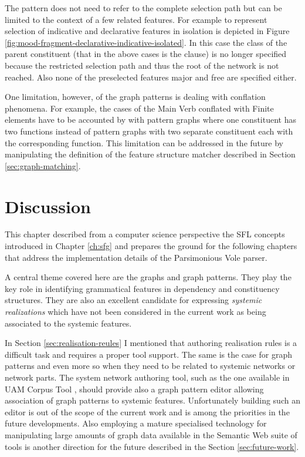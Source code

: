 The pattern does not need to refer to the complete selection path but can be limited to the context of a few related features. For example to represent selection of indicative and declarative features in isolation is depicted in Figure \ref{fig:mood-fragment-declarative-indicative-isolated}. In this case the class of the parent constituent (that in the above cases is the clause) is no longer specified because the restricted selection path and thus the root of the network is not reached. Also none of the preselected features major and free are specified either.  

One limitation, however, of the graph patterns is dealing with conflation phenomena. For example, the cases of the Main Verb conflated with Finite elements have to be accounted by with pattern graphs where one constituent has two functions instead of pattern graphs with two separate constituent each with the corresponding function. This limitation can be addressed in the future by manipulating the definition of the feature structure matcher described in Section \ref{sec:graph-matching}.

\section{Discussion}
This chapter described from a computer science perspective the SFL concepts introduced in Chapter \ref{ch:sfg} and prepares the ground for the following chapters that address the implementation details of the Parsimonious Vole parser.  

A central theme covered here are the graphs and graph patterns. They play the key role in identifying grammatical features in dependency and constituency structures. They are also an excellent candidate for expressing \textit{systemic realizations} which have not been considered in the current work as being associated to the systemic features.  

In Section \ref{sec:realisation-reules} I mentioned that authoring realisation rules is a difficult task and requires a proper tool support. The same is the case for graph patterns and even more so when they need to be related to systemic networks or network parts. The system network authoring tool, such as the one available in UAM Corpus Tool \citep{ODonnell2008a}, should provide also a graph pattern editor allowing association of graph patterns to systemic features. Unfortunately building such an editor is out of the scope of the current work and is among the priorities in the future developments. Also employing a mature specialised technology for manipulating large amounts of graph data available in the Semantic Web suite of tools is another direction for the future described in the Section \ref{sec:future-work}.

